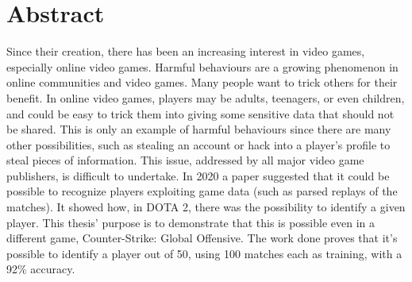 
\cleardoublepage
{}
{}
\begingroup
\let\clearpage\relax
\let\cleardoublepage\relax
\let\cleardoublepage\relax

\chapter*{Abstract}

	Since their creation, there has been an increasing interest in video games, especially online video games. 
	Harmful behaviours are a growing phenomenon in online communities and video games. 
	Many people want to trick others for their benefit.
	In online video games, players may be adults, teenagers, or even children, and could be easy to trick them into giving some sensitive data that should not be shared.
	This is only an example of harmful behaviours since there are many other possibilities, such as stealing an account or hack into a player's profile to steal pieces of information.
	This issue, addressed by all major video game publishers, is difficult to undertake.
	In 2020 a paper suggested that it could be possible to recognize players exploiting game data (such as parsed replays of the matches). 
	It showed how, in DOTA 2, there was the possibility to identify a given player. 
	This thesis' purpose is to demonstrate that this is possible even in a different game, Counter-Strike: Global Offensive. 
	The work done proves that it's possible to identify a player out of 50, using 100 matches each as training, with a 92\% accuracy.

\endgroup			

\vfill

